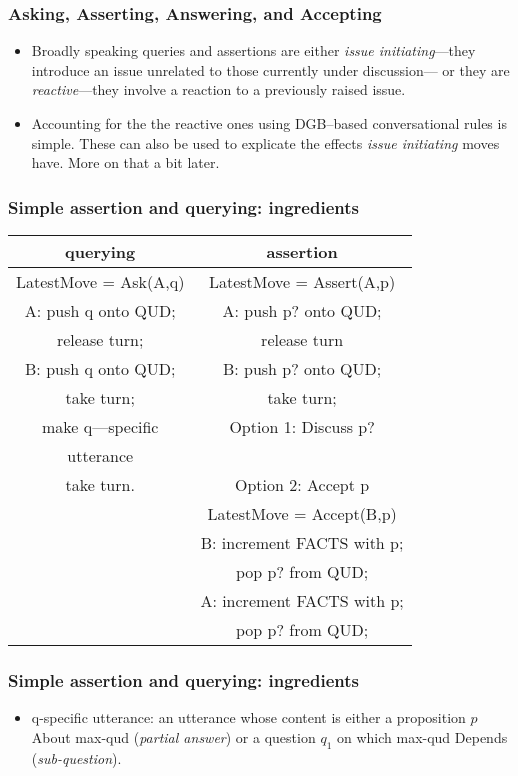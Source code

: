\documentclass{beamer}
\newcommand{\bit}{\begin{itemize}}
\newcommand{\eit}{\end{itemize}}
\begin{document}
\begin{frame}\frametitle{Asking, Asserting, Answering, and Accepting}

\bit

\item Broadly speaking queries and assertions are either \emph{issue
initiating}---they introduce an issue unrelated to those currently
under discussion--- or they are \emph{reactive}---they involve a
reaction to a previously raised issue.

\item Accounting for the the reactive ones using
DGB--based conversational rules is simple. These can also be used to
explicate the effects \emph{issue initiating} moves have. More on that a bit later.
\eit\end{frame}


\begin{frame}\frametitle{Simple assertion and querying: ingredients}

{\small
\begin{tabular}{|c|c|}
  \hline
  {\sf  querying  } & {\sf  assertion }\\ \hline
  \hline
  LatestMove =  Ask(A,q) & LatestMove =  Assert(A,p)\\ \hline
A: push q onto QUD; &  A:  push p? onto QUD;\\
release turn; & release turn \\ \hline
B: push  q onto QUD; &  B: push p? onto QUD;\\
 take turn; &  take turn;\\
make q---specific &  Option 1: Discuss p?  \\
utterance & \\
 take turn.& Option 2: Accept p\\ \hline
& LatestMove =  Accept(B,p)\\ \hline

& B: increment FACTS with p;\\
& pop p? from QUD;\\ \hline
& A: increment FACTS with p;\\
& pop p? from QUD;\\ \hline
\end{tabular}
}
\end{frame}

\begin{frame}\frametitle{Simple assertion and querying: ingredients}


\begin{itemize}
\item q-specific utterance: an utterance whose content is either a proposition $p$ {\sf
About} max-qud (\emph{partial answer}) or a question $q_1$ on which
max-qud {\sf Depends} (\emph{sub-question}).





\end{itemize}

 \end{frame}
\end{document}
